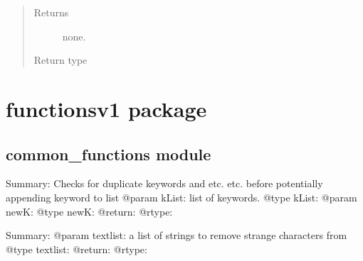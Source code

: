 \documentclass[letterpaper,10pt,english]{sphinxmanual}
\begin{document}
\begin{fulllineitems}
\begin{fulllineitems}
\begin{quote}
\begin{description}
\item[{Returns}] \leavevmode
none.

\item[{Return type}] \leavevmode


\end{description}\end{quote}

\end{fulllineitems}


\end{fulllineitems}



\chapter{functionsv1 package}
\label{\detokenize{functionsv1::doc}}\label{\detokenize{functionsv1:functionsv1-package}}

\section{common\_functions module}
\label{\detokenize{functionsv1:module-common_functions}}\label{\detokenize{functionsv1:common-functions-module}}

\begin{fulllineitems}
\label{\detokenize{functionsv1:common_functions.appendtokeywordlist}}
Summary: Checks for duplicate keywords and etc. etc. before potentially appending keyword to list
@param kList: list of keywords.
@type kList:
@param newK:
@type newK:
@return:
@rtype:

\end{fulllineitems}


\begin{fulllineitems}
\label{\detokenize{functionsv1:common_functions.cleantext}}
Summary:
@param textlist: a list of strings to remove strange characters from
@type textlist:
@return:
@rtype:

\end{fulllineitems}

\end{document}
